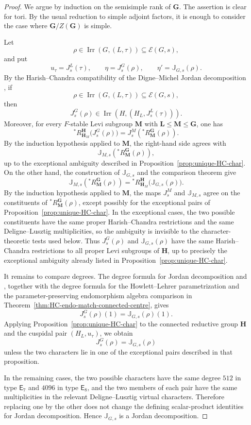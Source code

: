\documentclass{amsart}
\theoremstyle{plain}
\numberwithin{equation}{section}
\theoremstyle{definition}
\newcommand{\cE}{\mathcal{E}}
\newcommand{\Irr}{\operatorname{Irr}}
\newcommand{\J}{\mathbb{J}}
\newcommand{\bG}{\mathbf{G}}
\newcommand{\bL}{\mathbf{L}}
\newcommand{\bM}{\mathbf{M}}
\newcommand{\bH}{\mathbf{H}}
\begin{document}
\begin{proof}
We argue by induction on the semisimple rank of $\bG$.  The assertion is clear
for tori.  By the usual reduction to simple adjoint factors, it is enough to
consider the case where $\bG/Z(\bG)$ is simple.

Let
\[
\rho\in\Irr(G,(L,\tau))\subseteq\cE(G,s),
\]
and put
\[
u_\tau=J_s^L(\tau),\qquad
\eta=J_s^G(\rho),\qquad
\eta'=\J_{G,s}(\rho).
\]
By the Harish--Chandra compatibility of the Digne--Michel Jordan decomposition
\cite[Theorem~4.7.5]{Book:GeckandMalle}, if
\[
\rho\in \Irr(G,(L,\tau))\subseteq \cE(G,s),
\]
then
\[
J_s^G(\rho)\in \Irr(H,(H_L,J_s^L(\tau))).
\]
Moreover, for every $F$-stable Levi subgroup $\bM$ with
$\bL\leq \bM\leq \bG$, one has
\[
{}^*R_{\bH_M}^{\bH}\bigl(J_s^G(\rho)\bigr)
=
J_s^M\!\left({}^*R_{\bM}^{\bG}(\rho)\right).
\]
By the induction hypothesis applied to $\bM$, the right-hand side agrees with
\[
\J_{M,s}\!\left({}^*R_{\bM}^{\bG}(\rho)\right),
\]
up to the exceptional ambiguity described in
Proposition~\ref{prop:unique-HC-char}.  On the other hand, the construction of
$\J_{G,s}$ and the comparison theorem give
\[
\J_{M,s}\!\left({}^*R_{\bM}^{\bG}(\rho)\right)
=
{}^*R_{\bH_M}^{\bH}\bigl(\J_{G,s}(\rho)\bigr).
\]
By the induction hypothesis applied to $\bM$, the maps $J_s^M$ and $\J_{M,s}$
agree on the constituents of ${}^*R_{\bM}^{\bG}(\rho)$, except possibly for the
exceptional pairs of Proposition~\ref{prop:unique-HC-char}.  In the exceptional
cases, the two possible constituents have the same proper Harish--Chandra
restrictions and the same Deligne--Lusztig multiplicities, so the ambiguity is
invisible to the character-theoretic tests used below.  Thus $J_s^G(\rho)$ and
$\J_{G,s}(\rho)$ have the same Harish--Chandra restrictions to all proper
Levi subgroups of $\bH$, up to precisely the exceptional ambiguity already
listed in Proposition~\ref{prop:unique-HC-char}.

It remains to compare degrees.  The degree formula for Jordan decomposition \cite[Theorem 3.2.18]{Book:GeckandMalle} and \cite[Corollary 2.6.6]{Book:GeckandMalle},
together with the degree formula for the Howlett--Lehrer parametrization and
the parameter-preserving endomorphism algebra comparison in
Theorem~\ref{thm:HC-endo-match-connected-centre}, gives
\[
J_s^G(\rho)(1)=\J_{G,s}(\rho)(1).
\]
Applying Proposition~\ref{prop:unique-HC-char} to the connected reductive
group $\bH$ and the cuspidal pair $(H_L,u_\tau)$, we obtain
\[
J_s^G(\rho)=\J_{G,s}(\rho)
\]
unless the two characters lie in one of the exceptional pairs described in
that proposition.

In the remaining cases, the two possible characters have the same degree
\(512\) in type $\mathsf E_7$ and \(4096\) in type $\mathsf E_8$, and the two
members of each pair have the same multiplicities in the relevant
Deligne--Lusztig virtual characters.  Therefore replacing one by the other
does not change the defining scalar-product identities for Jordan
decomposition.  Hence $\J_{G,s}$ is a Jordan decomposition.
\end{proof}
\end{document}
